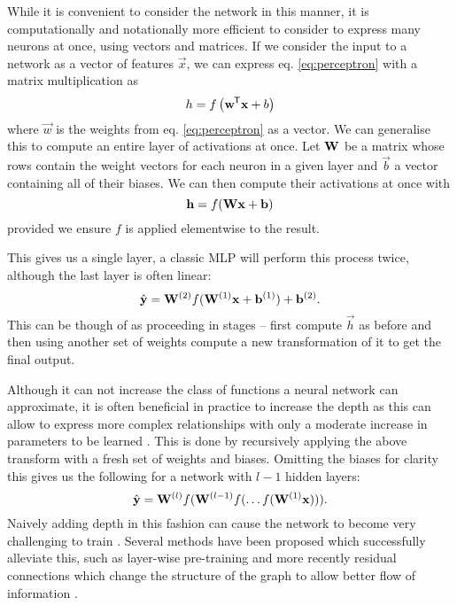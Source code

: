While it is convenient to consider the network in this manner, it is computationally and
notationally more efficient to consider to express many neurons at once, using vectors and matrices.
If we consider the input to a network as a vector of features \(\vec{x}\), we can express
eq. \eqref{eq:perceptron} with a matrix multiplication as
\begin{equation}\label{eq:vecperceptron}
	h = f\left(\mathbf{w}^{\mkern-1.5mu\mathsf{T}}\mathbf{x} + b\right)
\end{equation} where \(\vec{w}\) is the weights from eq. \eqref{eq:perceptron} as a vector.
We can generalise this to compute an entire layer of activations at once. Let \(\mathbf{W}\) be a matrix
whose rows contain the weight vectors for each neuron in a given layer and \(\vec{b}\) a vector
containing all of their biases. We can then compute their
activations at once with
\begin{equation}
	\mathbf{h} = f(\mathbf{W}\mathbf{x} + \mathbf{b})
\end{equation} provided we ensure \(f\) is applied elementwise to the result.

This gives us a single layer, a classic MLP will perform this process twice, although the last layer
is often linear:
\begin{equation}
	\hat{\mathbf{y}} = \mathbf{W}^{(2)}f(\mathbf{W}^{(1)}\mathbf{x} + \mathbf{b}^{(1)}) + \mathbf{b}^{(2)}.
\end{equation} This can be though of as proceeding in stages -- first compute \(\vec{h}\) as before
and then using another set of weights compute a new transformation of it to get the final output.

Although it can not increase the class of functions a neural network can approximate, it is often
beneficial in practice to increase the depth as this can allow to express more complex relationships
with only a moderate increase in parameters to be learned \autocite{Telgarsky2016}. This is done
by recursively applying the above transform with a fresh set of weights and biases. Omitting the
biases for clarity this gives us the following for a network with \(l-1\) hidden layers:
\begin{equation}
	\hat{\mathbf{y}} = \mathbf{W}^{(l)}f(\mathbf{W}^{(l-1)}f(\dots f(\mathbf{W}^{(1)}\mathbf{x}))).
\end{equation} Naively adding depth in this fashion can cause the network to become very challenging
to train \autocite{Glorot2010, Saxe2013}. Several methods have been proposed which successfully
alleviate this, such as layer-wise pre-training \autocite{Hinton2006,Vincent2010} and more
recently residual connections which change the structure of the graph to allow better flow of 
information \autocite{He2015}.

